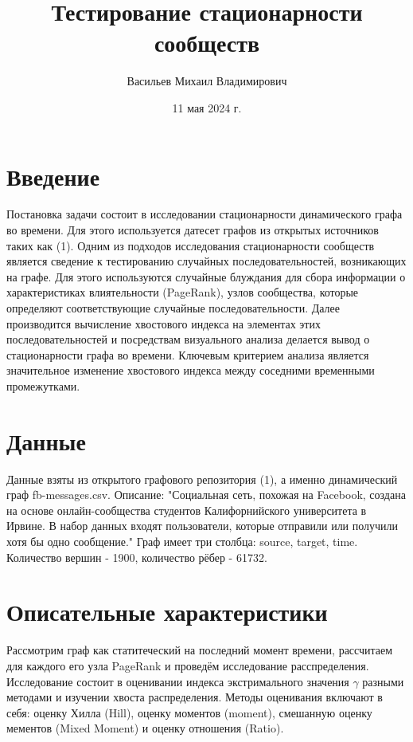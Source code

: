 \documentclass[reprint, amsmath, amssymb, aps,]{revtex4-2}
\begin{document}
\title{Тестирование стационарности сообществ}



\author{Васильев Михаил Владимирович}
%


\date{11 мая 2024 г.}%
             



\maketitle

\section{Введение}
Постановка задачи состоит в исследовании стационарности динамического графа во времени. Для этого используется датесет графов из открытых источников таких как (1). Одним из подходов исследования стационарности сообществ является сведение к тестированию случайных последовательностей, возникающих на графе. Для этого используются случайные блуждания для сбора информации о характеристиках влиятельности (PageRank), узлов сообщества, которые определяют соответствующие случайные последовательности. Далее производится вычисление хвостового индекса на элементах этих последовательностей и посредствам визуального анализа делается вывод о стационарности графа во времени. Ключевым критерием анализа является значительное изменение хвостового индекса между соседними временными промежутками.



\section{Данные}
Данные взяты из открытого графового репозитория (1), а именно динамический граф fb-messages.csv. Описание: "Социальная сеть, похожая на Facebook, создана на основе онлайн-сообщества студентов Калифорнийского университета в Ирвине. В набор данных входят пользователи, которые отправили или получили хотя бы одно сообщение." Граф имеет три столбца: source, target, time. Количество вершин - 1900, количество рёбер - 61732.


\section{Описательные характеристики}
Рассмотрим граф как статитеческий на последний момент времени, рассчитаем для каждого его узла PageRank и проведём исследование расспределения. Исследование состоит в оценивании индекса экстримального значения $\gamma$ разными методами и изучении хвоста распределения. Методы оценивания включают в себя: оценку Хилла (Hill), оценку моментов (moment),  смешанную оценку мементов (Mixed Moment) и оценку отношения (Ratio).
\end{document}
